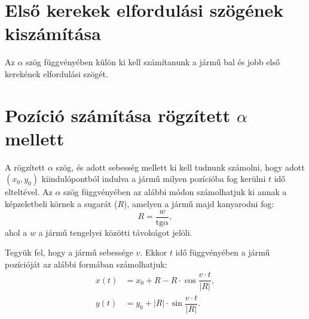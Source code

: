 \documentclass[a4paper]{paper}
\begin{document}
\section{Első kerekek elfordulási szögének kiszámítása}

Az $\alpha$ szög függvényében külön ki kell számítanunk a jármű bal és jobb első kerekének elfordulási szögét.


\section{Pozíció számítása rögzített $\alpha$ mellett}

A rögzített $\alpha$ szög, és adott sebesség mellett ki kell tudnunk számolni, hogy adott $(x_0, y_0)$ kiindulópontból indulva a jármű milyen pozícióba fog kerülni $t$ idő elteltével. Az $\alpha$ szög függvényében az alábbi módon számolhatjuk ki annak a képzeletbeli körnek a sugarát ($R$), amelyen a jármű majd kanyarodni fog:
\[
R = \dfrac{w}{\text{tg} \alpha},
\]
ahol a $w$ a jármű tengelyei közötti távolságot jelöli.

Tegyük fel, hogy a jármű sebessége $v$. Ekkor $t$ idő függvényében a jármű pozícióját az alábbi formában számolhatjuk:
\begin{align*}
x(t) &= x_0 + R - R \cdot \cos \dfrac{v \cdot t}{|R|}, \\
y(t) &= y_0 + |R| \cdot \sin \dfrac{v \cdot t}{|R|}.
\end{align*}
\end{document}
